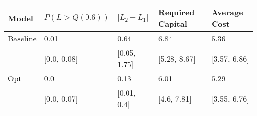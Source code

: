 \begin{tabular}{lllll}
\toprule
   Model & $P(L > Q(0.6))$ & $|L_2 - L_1|$ & Required Capital & Average Cost \\
\midrule
Baseline &            0.01 &          0.64 &             6.84 &         5.36 \\
         &     [0.0, 0.08] &  [0.05, 1.75] &     [5.28, 8.67] & [3.57, 6.86] \\
     Opt &             0.0 &          0.13 &             6.01 &         5.29 \\
         &     [0.0, 0.07] &   [0.01, 0.4] &      [4.6, 7.81] & [3.55, 6.76] \\
\bottomrule
\end{tabular}
